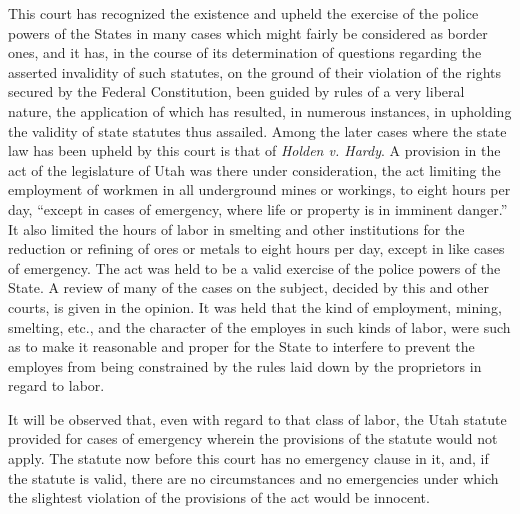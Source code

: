 \documentclass[
  letterpaper,
  11pt,
  DIV=9,
  openright]{scrbook}
\begin{document}
This court has recognized the existence and upheld the exercise of the
police powers of the States in many cases which might fairly be
considered as border ones, and it has, in the course of its
determination of questions regarding the asserted invalidity of such
statutes, on the ground of their violation of the rights secured by the
Federal Constitution, been guided by rules of a very liberal nature, the
application of which has resulted, in numerous instances, in upholding
the validity of state statutes thus assailed. Among the later cases
where the state law has been upheld by this court is that of
\emph{Holden v. Hardy}. A provision in the act of the legislature of
Utah was there under consideration, the act limiting the employment of
workmen in all underground mines or workings, to eight hours per day,
``except in cases of emergency, where life or property is in imminent
danger.'' It also limited the hours of labor in smelting and other
institutions for the reduction or refining of ores or metals to eight
hours per day, except in like cases of emergency. The act was held to be
a valid exercise of the police powers of the State. A review of many of
the cases on the subject, decided by this and other courts, is given in
the opinion. It was held that the kind of employment, mining, smelting,
etc., and the character of the employes in such kinds of labor, were
such as to make it reasonable and proper for the State to interfere to
prevent the employes from being constrained by the rules laid down by
the proprietors in regard to labor.

It will be observed that, even with regard to that class of labor, the
Utah statute provided for cases of emergency wherein the provisions of
the statute would not apply. The statute now before this court has no
emergency clause in it, and, if the statute is valid, there are no
circumstances and no emergencies under which the slightest violation of
the provisions of the act would be innocent.
\end{document}
